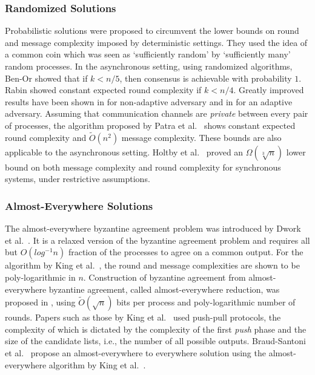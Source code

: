\subsubsection{Randomized Solutions} Probabilistic solutions were proposed to
circumvent the lower bounds on round and message complexity imposed by
deterministic settings. They used the idea of a common coin which was seen as
`sufficiently random' by `sufficiently many' random processes.  In the
asynchronous setting, using randomized algorithms, Ben-Or \cite{Ben-Or83}
showed that if $k < n/5$, then consensus is achievable with probability $1$.
Rabin \cite{Rabin83} showed constant expected round complexity if $k < n/4$.
Greatly improved results have been shown in \cite{PCR14, KKKSS08, MHR14} for
non-adaptive adversary and in \cite{KS13,AAKS14} for an adaptive adversary.
Assuming that communication channels are \textit{private} between every pair of
processes, the algorithm proposed by Patra et al.~\cite{PR10} shows constant
expected round complexity and $\tilde{O}(n^2)$ message complexity. These bounds
are also applicable to the asynchronous setting. Holtby et al.~\cite{HKK08} 
proved an $\Omega(\sqrt[3]{n})$ lower bound on both message complexity and
round complexity for synchronous systems, under restrictive assumptions.

\subsubsection{Almost-Everywhere Solutions} The almost-everywhere byzantine
agreement problem was introduced by Dwork et al.~\cite{DPPU88}. It is
a relaxed version of the byzantine agreement problem and requires all but
$O(log^{-1}n)$ fraction of the processes to agree on a common output. For the
algorithm by King et al.~\cite{KSSV06}, the round and message complexities are shown to be
poly-logarithmic in $n$. Construction of byzantine agreement from
almost-everywhere byzantine agreement, called almost-everywhere reduction, was
proposed in \cite{KS09,KLST11}, using $\tilde{O}(\sqrt{n})$ bits per process
and poly-logarithmic number of rounds.  Papers such as those by King et al.~\cite{KLST11} used
push-pull protocols, the complexity of which is dictated by the complexity of
the first \textit{push} phase and the size of the candidate lists, i.e., the
number of all possible outputs. Braud-Santoni et al.~\cite{BGH13} propose an
almost-everywhere to everywhere solution using the almost-everywhere algorithm
by King et al.~\cite{KSSV06}.

